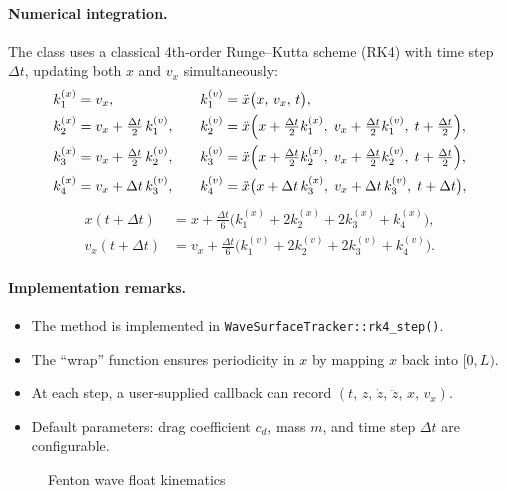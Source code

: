 \documentclass[11pt,letterpaper]{article}
\begin{document}
\paragraph{Numerical integration.}  
The class uses a classical 4th‐order Runge–Kutta scheme (RK4)
with time step \(\Delta t\), updating both \(x\) and \(v_x\) simultaneously:
\[
\begin{aligned}
  k_{1}^{(x)} &= v_x, 
  &\quad
  k_{1}^{(v)} &= \ddot x\bigl(x,\,v_x,\,t\bigr),\\
  k_{2}^{(x)} &= v_x + \tfrac{\Delta t}{2}\,k_{1}^{(v)}, 
  &\quad
  k_{2}^{(v)} &= \ddot x\Bigl(x + \tfrac{\Delta t}{2}k_{1}^{(x)},\;v_x + \tfrac{\Delta t}{2}k_{1}^{(v)},\;t+\tfrac{\Delta t}{2}\Bigr),\\
  k_{3}^{(x)} &= v_x + \tfrac{\Delta t}{2}\,k_{2}^{(v)}, 
  &\quad
  k_{3}^{(v)} &= \ddot x\Bigl(x + \tfrac{\Delta t}{2}k_{2}^{(x)},\;v_x + \tfrac{\Delta t}{2}k_{2}^{(v)},\;t+\tfrac{\Delta t}{2}\Bigr),\\
  k_{4}^{(x)} &= v_x + \Delta t\,k_{3}^{(v)}, 
  &\quad
  k_{4}^{(v)} &= \ddot x\bigl(x + \Delta t\,k_{3}^{(x)},\;v_x + \Delta t\,k_{3}^{(v)},\;t+\Delta t\bigr),
\end{aligned}
\]
\[
\begin{aligned}
  x(t+\Delta t) &= x + \tfrac{\Delta t}{6}\bigl(k_{1}^{(x)} + 2k_{2}^{(x)} + 2k_{3}^{(x)} + k_{4}^{(x)}\bigr),\\
  v_x(t+\Delta t) &= v_x + \tfrac{\Delta t}{6}\bigl(k_{1}^{(v)} + 2k_{2}^{(v)} + 2k_{3}^{(v)} + k_{4}^{(v)}\bigr).
\end{aligned}
\]

\paragraph{Implementation remarks.}
\begin{itemize}
  \item The method is implemented in \texttt{WaveSurfaceTracker::rk4\_step()}.
  \item The “wrap” function ensures periodicity in \(x\) by mapping \(x\) back into \([0,L)\).
  \item At each step, a user‐supplied callback can record \((t,\,z,\,\dot z,\,\ddot z,\,x,\,v_x)\).
  \item Default parameters: drag coefficient \(c_d\), mass \(m\), and time step \(\Delta t\) are configurable.
\end{itemize}

\begin{figure}[H]
    \centering
    \resizebox{\textwidth}{!}{}
    \caption{Fenton wave float kinematics}
    \label{fig:waveKinematics}
\end{figure}
\end{document}
